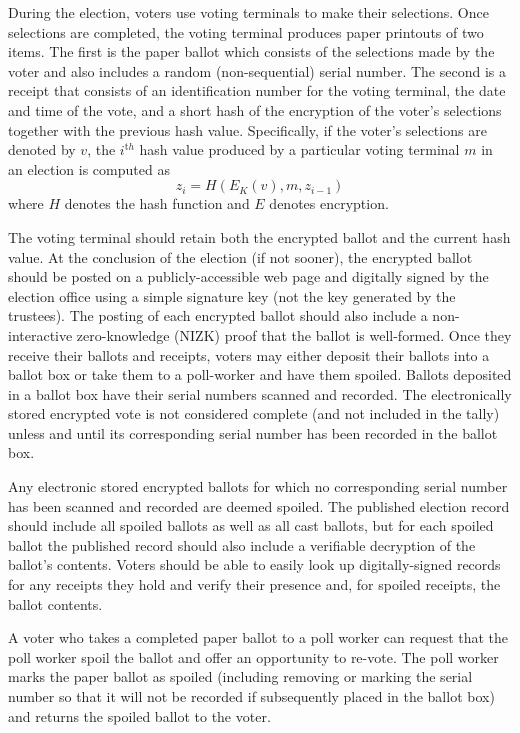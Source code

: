 During the election, voters use voting terminals to make their
selections.  Once selections are completed, the voting terminal
produces paper printouts of two items.  The first is the paper ballot
which consists of the selections made by the voter and also includes a
random (non-sequential) serial number.  The second is a receipt that
consists of an identification number for the voting terminal,
the date and time of the vote, and a short hash of the encryption of
the voter's selections together with the previous hash value.
Specifically, if the voter's selections are denoted by $v$, the
$i^{{\mathrm th}}$ hash value produced by a particular voting terminal $m$ in an election is computed as
\[
z_i=H(E_K(v),m,z_{i-1} )
\]
\noindent
where $H$ denotes the hash function and $E$ denotes encryption.

The voting terminal should retain both the encrypted ballot and the current hash value.  At the conclusion of the election (if not sooner), the encrypted ballot should be posted on a publicly-accessible web page and digitally signed by the election office using a simple signature key (not the key generated by the trustees).  The posting of each encrypted ballot should also include a non-interactive zero-knowledge (NIZK) proof that the ballot is well-formed.
Once they receive their ballots and receipts, voters may either deposit their ballots into a ballot box or take them to a poll-worker and have them spoiled.  Ballots deposited in a ballot box have their serial numbers scanned and recorded.  The electronically stored encrypted vote is not considered complete (and not included in the tally) unless and until its corresponding serial number has been recorded in the ballot box.

Any electronic stored encrypted ballots for which no corresponding serial number has been scanned and recorded are deemed spoiled.  The published election record should include all spoiled ballots as well as all cast ballots, but for each spoiled ballot the published record should also include a verifiable decryption of the ballot's contents.  Voters should be able to easily look up digitally-signed records for any receipts they hold and verify their presence and, for spoiled receipts, the ballot contents.

A voter who takes a completed paper ballot to a poll worker can request that the poll worker spoil the ballot and offer an opportunity to re-vote.  The poll worker marks the paper ballot as spoiled (including removing or marking the serial number so that it will not be recorded if subsequently placed in the ballot box) and returns the spoiled ballot to the voter.


